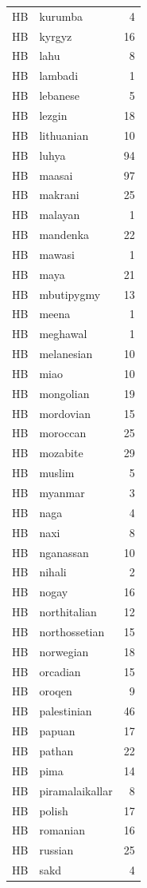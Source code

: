 \begin{longtable}[t]{llr}
HB & kurumba & 4\\
HB & kyrgyz & 16\\
HB & lahu & 8\\
HB & lambadi & 1\\
HB & lebanese & 5\\
HB & lezgin & 18\\
HB & lithuanian & 10\\
HB & luhya & 94\\
HB & maasai & 97\\
HB & makrani & 25\\
HB & malayan & 1\\
HB & mandenka & 22\\
HB & mawasi & 1\\
HB & maya & 21\\
HB & mbutipygmy & 13\\
HB & meena & 1\\
HB & meghawal & 1\\
HB & melanesian & 10\\
HB & miao & 10\\
HB & mongolian & 19\\
HB & mordovian & 15\\
HB & moroccan & 25\\
HB & mozabite & 29\\
HB & muslim & 5\\
HB & myanmar & 3\\
HB & naga & 4\\
HB & naxi & 8\\
HB & nganassan & 10\\
HB & nihali & 2\\
HB & nogay & 16\\
HB & northitalian & 12\\
HB & northossetian & 15\\
HB & norwegian & 18\\
HB & orcadian & 15\\
HB & oroqen & 9\\
HB & palestinian & 46\\
HB & papuan & 17\\
HB & pathan & 22\\
HB & pima & 14\\
HB & piramalaikallar & 8\\
HB & polish & 17\\
HB & romanian & 16\\
HB & russian & 25\\
HB & sakd & 4\\

\end{longtable}

